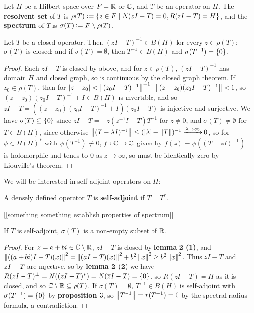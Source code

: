 \documentclass[10pt]{amsart}
\begin{document}
\begin{definition}
    Let $H$ be a Hilbert space over $F = \mathbb{R}$ or $\mathbb{C}$, and $T$ be an operator on $H$. The \textbf{resolvent set} of $T$ is $\rho(T) \vcentcolon= \left\{  z \in F \mid N(zI - T) = 0, R(zI - T) = H  \right\}$, and the \textbf{spectrum} of $T$ is $\sigma(T) \vcentcolon= F \setminus \rho(T)$.
\end{definition}
\begin{proposition}\label{closedprops}
    Let $T$ be a closed operator. Then $(zI - T)^{-1} \in B(H)$ for every $z \in \rho(T)$; $\sigma(T)$ is closed; and if $\sigma(T) = \emptyset$, then $T^{-1} \in B(H)$ and $\sigma(T^{-1}) = \left\{  0  \right\}$.
\end{proposition}
\begin{proof}
    Each $zI - T$ is closed by above, and for $z \in \rho(T)$, $(zI - T)^{-1}$ has domain $H$ and closed graph, so is continuous by the closed graph theorem. If $z_0 \in \rho(T)$, then for $\left| z - z_0 \right| < \left\| (z_0I - T)^{-1} \right\|^{-1}$, $\left\| (z - z_0)(z_0I - T)^{-1} \right\| < 1$, so $(z - z_0)(z_0I - T)^{-1} + I \in B(H)$ is invertible, and so $zI - T = ((z - z_0)(z_0I - T)^{-1} + I)(z_0I - T)$ is injective and surjective. We have $\sigma(T) \subseteq \left\{  0  \right\}$ since $zI - T = -z(z^{-1}I - T)T^{-1}$ for $z \neq 0$, and $\sigma(T) \neq \emptyset$ for $T \in B(H)$, since otherwise $\left\| (T - \lambda I)^{-1} \right\| \leq (\left| \lambda \right| - \left\| T \right\|)^{-1} \xrightarrow{\lambda \to \infty} 0$, so for $\phi \in B(H)^*$ with $\phi(T^{-1}) \neq 0$, $f : \mathbb{C} \to \mathbb{C}$ given by $f(z) = \phi((T - z I)^{-1})$ is holomorphic and tends to 0 as $z \to \infty$, so must be identically zero by Liouville's theorem. 
\end{proof}
We will be interested in self-adjoint operators on $H$:
\begin{definition}
    A densely defined operator $T$ is \textbf{self-adjoint} if $T = T^*$.
\end{definition}
[[something something establish properties of spectrum]]
\begin{lemma}
    If $T$ is self-adjoint, $\sigma(T)$ is a non-empty subset of $\mathbb{R}$.
\end{lemma}
\begin{proof}
    For $z = a + bi \in \mathbb{C} \setminus \mathbb{R}$, $zI - T$ is closed by \textbf{lemma 2 (1)}, and $\left\| ((a + bi)I - T)(x) \right\|^2 = \left\| (aI - T)(x) \right\|^2 + b^2\left\| x \right\|^2 \geq b^2\left\| x \right\|^2$. Thus $zI - T$ and $\overline{z}I - T$ are injective, so by \textbf{lemma 2 (2)} we have $R(zI - T)^\perp = N((zI - T)^*) = N(\overline{z} I - T) = \left\{  0  \right\}$, so $R(zI - T) = H$ as it is closed, and so $\mathbb{C} \setminus \mathbb{R} \subseteq \rho(T)$. If $\sigma(T) = \emptyset$, $T^{-1} \in B(H)$ is self-adjoint with $\sigma(T^{-1}) = \left\{  0  \right\}$ by \textbf{proposition 3}, so $\left\| T^{-1} \right\| = r(T^{-1}) = 0$ by the spectral radius formula, a contradiction.
\end{proof}
\end{document}
